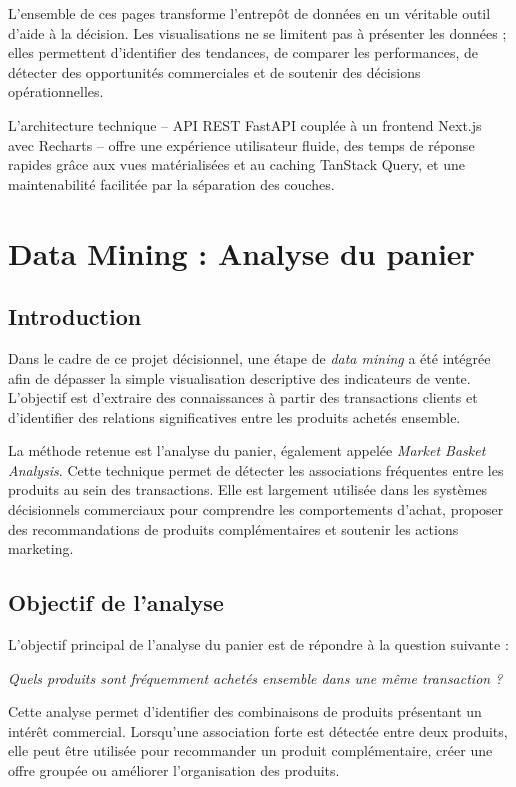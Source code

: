 \documentclass[12pt,a4paper,twoside]{report}
\begin{document}
L'ensemble de ces pages transforme l'entrepôt de données en un véritable outil d'aide à la décision. Les visualisations ne se limitent pas à présenter les données ; elles permettent d'identifier des tendances, de comparer les performances, de détecter des opportunités commerciales et de soutenir des décisions opérationnelles.

L'architecture technique -- API REST FastAPI couplée à un frontend Next.js avec Recharts -- offre une expérience utilisateur fluide, des temps de réponse rapides grâce aux vues matérialisées et au caching TanStack Query, et une maintenabilité facilitée par la séparation des couches.

\chapter{Data Mining : Analyse du panier}

\section{Introduction}

Dans le cadre de ce projet décisionnel, une étape de \textit{data mining} a été intégrée afin de dépasser la simple visualisation descriptive des indicateurs de vente. L'objectif est d'extraire des connaissances à partir des transactions clients et d'identifier des relations significatives entre les produits achetés ensemble.

La méthode retenue est l'analyse du panier, également appelée \textit{Market Basket Analysis}. Cette technique permet de détecter les associations fréquentes entre les produits au sein des transactions. Elle est largement utilisée dans les systèmes décisionnels commerciaux pour comprendre les comportements d'achat, proposer des recommandations de produits complémentaires et soutenir les actions marketing.

\section{Objectif de l'analyse}

L'objectif principal de l'analyse du panier est de répondre à la question suivante :

\begin{center}
\textit{Quels produits sont fréquemment achetés ensemble dans une même transaction ?}
\end{center}

Cette analyse permet d'identifier des combinaisons de produits présentant un intérêt commercial. Lorsqu'une association forte est détectée entre deux produits, elle peut être utilisée pour recommander un produit complémentaire, créer une offre groupée ou améliorer l'organisation des produits.
\end{document}
